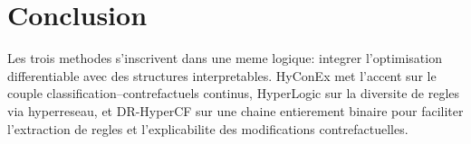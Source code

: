 \documentclass[11pt,a4paper]{article}
\begin{document}
\section{Conclusion}
Les trois methodes s'inscrivent dans une meme logique:
integrer l'optimisation differentiable avec des structures interpretables.
HyConEx met l'accent sur le couple classification--contrefactuels continus,
HyperLogic sur la diversite de regles via hyperreseau,
et DR-HyperCF sur une chaine entierement binaire pour faciliter l'extraction de regles
et l'explicabilite des modifications contrefactuelles.
\end{document}
